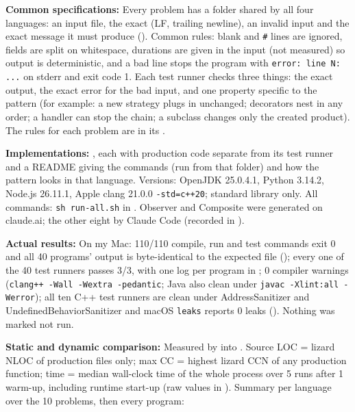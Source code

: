 \documentclass[11pt,a4paper]{article}
\newcommand{\entry}[1]{\textbf{#1:} }
\begin{document}
\entry{Common specifications}Every problem has a  folder shared by all four languages: an input file, the exact  (LF, trailing newline), an invalid input and the exact message it must produce (). Common rules: blank and \texttt{\#} lines are ignored, fields are split on whitespace, durations are given in the input (not measured) so output is deterministic, and a bad line stops the program with \texttt{error: line N: ...} on stderr and exit code 1. Each test runner checks three things: the exact output, the exact error for the bad input, and one property specific to the pattern (for example: a new strategy plugs in unchanged; decorators nest in any order; a handler can stop the chain; a subclass changes only the created product). The rules for each problem are in its .

\entry{Implementations}, each with production code separate from its test runner and a README giving the commands (run from that folder) and how the pattern looks in that language. Versions: OpenJDK 25.0.4.1, Python 3.14.2, Node.js 26.11.1, Apple clang 21.0.0 \texttt{-std=c++20}; standard library only. All commands: \texttt{sh run-all.sh} in . Observer and Composite were generated on claude.ai; the other eight by Claude Code (recorded in ).

\entry{Actual results}On my Mac: 110/110 compile, run and test commands exit 0 and all 40 programs' output is byte-identical to the expected file (); every one of the 40 test runners passes 3/3, with one log per program in ; 0 compiler warnings (\texttt{clang++ -Wall -Wextra -pedantic}; Java also clean under \texttt{javac -Xlint:all -Werror}); all ten C++ test runners are clean under AddressSanitizer and UndefinedBehaviorSanitizer and macOS \texttt{leaks} reports 0 leaks (). Nothing was marked not run.

\entry{Static and dynamic comparison}Measured by  into . Source LOC = lizard NLOC of production files only; max CC = highest lizard CCN of any production function; time = median wall-clock time of the whole process over 5 runs after 1 warm-up, including runtime start-up (raw values in ). Summary per language over the 10 problems, then every program:
\end{document}
